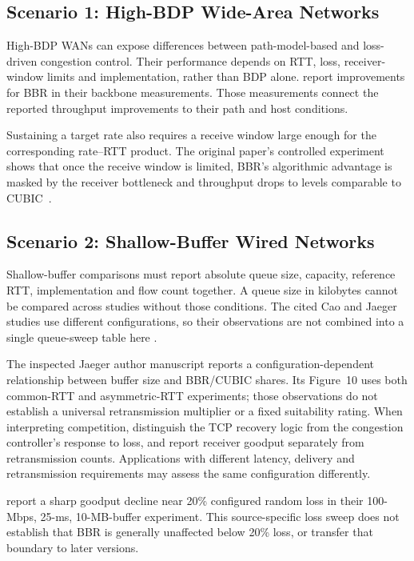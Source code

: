\documentclass[a4paper,fleqn]{cas-sc}
\begin{document}
\subsection{Scenario 1: High-BDP Wide-Area Networks}
\label{sec:wan}

High-BDP WANs can expose differences between path-model-based and
loss-driven congestion control. Their performance depends on RTT, loss,
receiver-window limits and implementation, rather than BDP alone.
\citet{cardwell2017bbr} report improvements for BBR in their backbone
measurements. Those measurements connect the reported throughput improvements to their
path and host conditions.

Sustaining a target rate also requires a receive window large enough for
the corresponding rate--RTT product.
The original paper's controlled experiment shows that once the receive window is
limited, BBR's algorithmic advantage is masked by the receiver bottleneck and
throughput drops to levels comparable to CUBIC~\citep{cardwell2017bbr}.

\subsection{Scenario 2: Shallow-Buffer Wired Networks}
\label{sec:shallow}

Shallow-buffer comparisons must report absolute queue size, capacity,
reference RTT, implementation and flow count together. A queue size in
kilobytes cannot be compared across studies without those conditions.
The cited Cao and Jaeger studies use different configurations, so their
observations are not combined into a single queue-sweep table here
\citep{cao2019bbr,jaeger2019bbr}.

The inspected Jaeger author manuscript reports a configuration-dependent
relationship between buffer size and BBR/CUBIC shares. Its Figure~10 uses
both common-RTT and asymmetric-RTT experiments; those observations do
not establish a universal retransmission multiplier or a fixed suitability
rating. When interpreting competition, distinguish the TCP recovery logic
from the congestion controller's response to loss, and report receiver
goodput separately from retransmission counts. Applications with different
latency, delivery and retransmission requirements may assess the same
configuration differently.

\citet{cao2019bbr} report a sharp goodput decline near 20\% configured
random loss in their 100-Mbps, 25-ms, 10-MB-buffer experiment. This
source-specific loss sweep does not establish that BBR is generally
unaffected below 20\% loss, or transfer that boundary to later versions.
\end{document}
